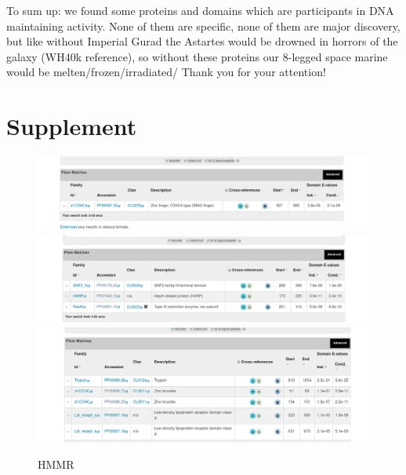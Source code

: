 \documentclass{article}
\begin{document}
 To sum up: we found some proteins and domains which are participants in DNA maintaining activity. None of them are specific, none of them are major discovery, but like without Imperial Gurad the Astartes would be drowned in horrors of the galaxy (WH40k reference), so without these proteins our 8-legged space marine would be melten/frozen/irradiated/%
 Thank you for your attention!
 
 
 \newpage 
 \section{Supplement}
  \begin{figure}[h]
 	\centering
 	\includegraphics[scale=0.53]{1}  
 	\includegraphics[scale=0.53]{2}
 	\includegraphics[scale=0.53]{3}
 	\caption{ HMMR }
 	\label{tree}
 \end{figure}
 
 
 
\end{document}
